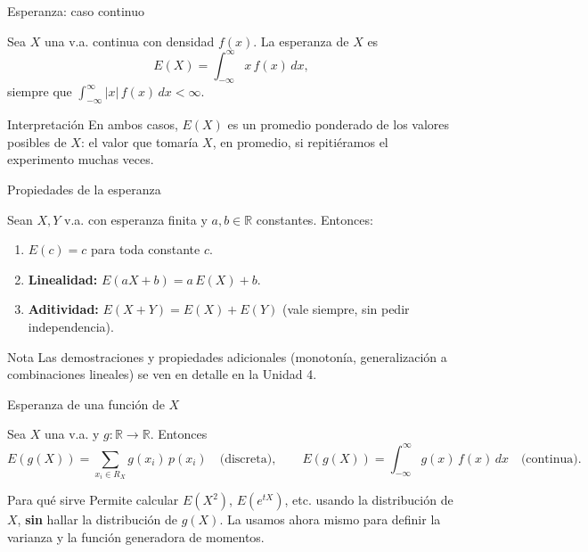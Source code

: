 \documentclass[aspectratio=169,11pt]{beamer}
\begin{document}
\begin{frame}{Esperanza: caso continuo}
\begin{definition}
Sea $X$ una v.a. continua con densidad $f(x)$. La esperanza de $X$ es
\[
E(X) = \int_{-\infty}^{\infty} x\, f(x)\, dx,
\]
siempre que $\displaystyle\int_{-\infty}^{\infty}|x|\,f(x)\,dx < \infty$.
\end{definition}

\begin{alertblock}{Interpretación}
En ambos casos, $E(X)$ es un promedio ponderado de los valores posibles de $X$: el valor que tomaría $X$, en promedio, si repitiéramos el experimento muchas veces.
\end{alertblock}
\end{frame}

\begin{frame}{Propiedades de la esperanza}
\begin{theorem}[Propiedades]
Sean $X,Y$ v.a. con esperanza finita y $a,b\in\mathbb{R}$ constantes. Entonces:
\begin{enumerate}
\item $E(c) = c$ para toda constante $c$.
\item \textbf{Linealidad:} $E(aX+b) = a\,E(X) + b$.
\item \textbf{Aditividad:} $E(X+Y) = E(X)+E(Y)$ (vale siempre, sin pedir independencia).
\end{enumerate}
\end{theorem}

\begin{alertblock}{Nota}
Las demostraciones y propiedades adicionales (monotonía, generalización a combinaciones lineales) se ven en detalle en la Unidad 4.
\end{alertblock}
\end{frame}

\begin{frame}{Esperanza de una función de $X$}
\begin{theorem}
Sea $X$ una v.a. y $g:\mathbb{R}\to\mathbb{R}$. Entonces
\[
E(g(X)) = \sum_{x_i\in R_X} g(x_i)\,p(x_i) \quad\text{(discreta)}, \qquad E(g(X)) = \int_{-\infty}^{\infty} g(x)\,f(x)\,dx \quad\text{(continua)}.
\]
\end{theorem}

\begin{alertblock}{Para qué sirve}
Permite calcular $E(X^2)$, $E(e^{tX})$, etc. usando la distribución de $X$, \textbf{sin} hallar la distribución de $g(X)$. La usamos ahora mismo para definir la varianza y la función generadora de momentos.
\end{alertblock}
\end{frame}
\end{document}
